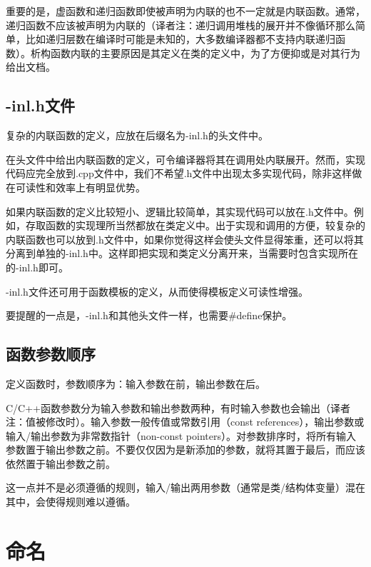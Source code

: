 重要的是，虚函数和递归函数即使被声明为内联的也不一定就是内联函数。通常，递归函数不应该被声明为内联的（译者注：递归调用堆栈的展开并不像循环那么简单，比如递归层数在编译时可能是未知的，大多数编译器都不支持内联递归函数）。析构函数内联的主要原因是其定义在类的定义中，为了方便抑或是对其行为给出文档。


\section{-inl.h文件}
复杂的内联函数的定义，应放在后缀名为-inl.h的头文件中。

在头文件中给出内联函数的定义，可令编译器将其在调用处内联展开。然而，实现代码应完全放到.cpp文件中，我们不希望.h文件中出现太多实现代码，除非这样做在可读性和效率上有明显优势。

如果内联函数的定义比较短小、逻辑比较简单，其实现代码可以放在.h文件中。例如，存取函数的实现理所当然都放在类定义中。出于实现和调用的方便，较复杂的内联函数也可以放到.h文件中，如果你觉得这样会使头文件显得笨重，还可以将其分离到单独的-inl.h中。这样即把实现和类定义分离开来，当需要时包含实现所在的-inl.h即可。

-inl.h文件还可用于函数模板的定义，从而使得模板定义可读性增强。

要提醒的一点是，-inl.h和其他头文件一样，也需要\#define保护。


\section{函数参数顺序}
定义函数时，参数顺序为：输入参数在前，输出参数在后。

C/C++函数参数分为输入参数和输出参数两种，有时输入参数也会输出（译者注：值被修改时）。输入参数一般传值或常数引用（const references），输出参数或输入/输出参数为非常数指针（non-const pointers）。对参数排序时，将所有输入参数置于输出参数之前。不要仅仅因为是新添加的参数，就将其置于最后，而应该依然置于输出参数之前。

这一点并不是必须遵循的规则，输入/输出两用参数（通常是类/结构体变量）混在其中，会使得规则难以遵循。


\chapter{命名}


